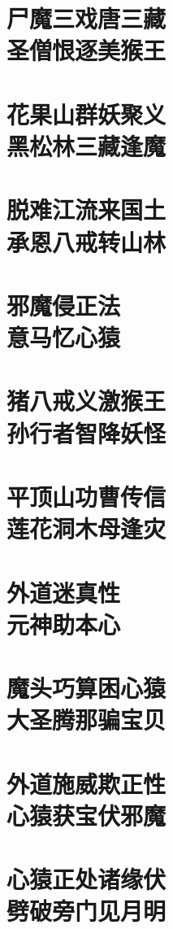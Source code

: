 \documentclass[a4paper,12pt,UTF8,twoside]{ctexbook}
\begin{document}
\chapter[尸魔三戏唐三藏\ 圣僧恨逐美猴王]{尸魔三戏唐三藏\\圣僧恨逐美猴王}
\chapter[花果山群妖聚义\ 黑松林三藏逢魔]{花果山群妖聚义\\黑松林三藏逢魔}
\chapter[脱难江流来国土\ 承恩八戒转山林]{脱难江流来国土\\承恩八戒转山林}
\chapter[邪魔侵正法\ 意马忆心猿]{邪魔侵正法\\意马忆心猿}
\chapter[猪八戒义激猴王\ 孙行者智降妖怪]{猪八戒义激猴王\\孙行者智降妖怪}
\chapter[平顶山功曹传信\ 莲花洞木母逢灾]{平顶山功曹传信\\莲花洞木母逢灾}
\chapter[外道迷真性\ 元神助本心]{外道迷真性\\元神助本心}
\chapter[魔头巧算困心猿\ 大圣腾那骗宝贝]{魔头巧算困心猿\\大圣腾那骗宝贝}
\chapter[外道施威欺正性\ 心猿获宝伏邪魔]{外道施威欺正性\\心猿获宝伏邪魔}
\chapter[心猿正处诸缘伏\ 劈破旁门见月明]{心猿正处诸缘伏\\劈破旁门见月明}
\end{document}
